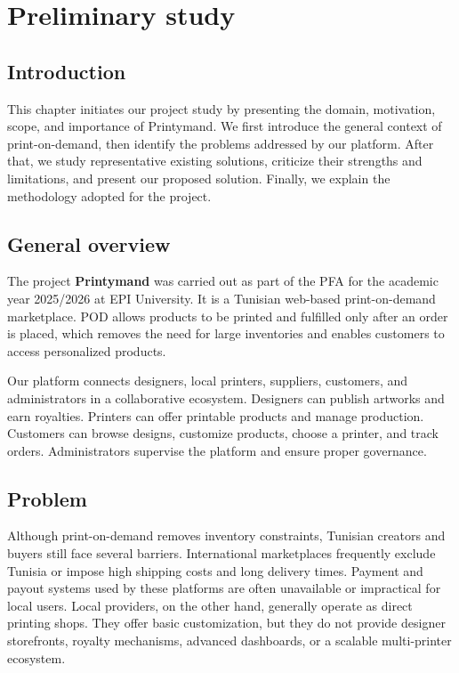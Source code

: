 \chapter{Preliminary study}
\label{ch::chapter2}

\section{Introduction}
This chapter initiates our project study by presenting the domain, motivation, scope, and importance of Printymand.
We first introduce the general context of print-on-demand, then identify the problems addressed by our platform.
After that, we study representative existing solutions, criticize their strengths and limitations, and present our proposed solution.
Finally, we explain the methodology adopted for the project.

\section{General overview}
The project \textbf{Printymand} was carried out as part of the PFA for the academic year 2025/2026 at EPI University.
It is a Tunisian web-based print-on-demand marketplace.
POD allows products to be printed and fulfilled only after an order is placed, which removes the need for large inventories and enables customers to access personalized products.

Our platform connects designers, local printers, suppliers, customers, and administrators in a collaborative ecosystem.
Designers can publish artworks and earn royalties.
Printers can offer printable products and manage production.
Customers can browse designs, customize products, choose a printer, and track orders.
Administrators supervise the platform and ensure proper governance.

\section{Problem}
Although print-on-demand removes inventory constraints, Tunisian creators and buyers still face several barriers.
International marketplaces frequently exclude Tunisia or impose high shipping costs and long delivery times.
Payment and payout systems used by these platforms are often unavailable or impractical for local users.
Local providers, on the other hand, generally operate as direct printing shops.
They offer basic customization, but they do not provide designer storefronts, royalty mechanisms, advanced dashboards, or a scalable multi-printer ecosystem.

